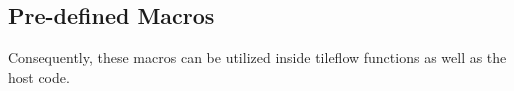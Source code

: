 \subsection*{Pre-defined Macros}

Consequently, these macros can be utilized inside tileflow functions as well as the host code.
